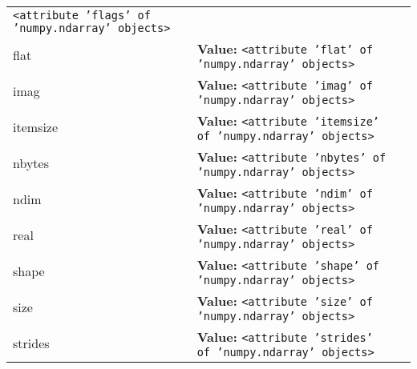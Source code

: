 \begin{longtable}{|p{}|p{}|l}
{\tt {\textless}attribute 'flags' of 'numpy.ndarray' objects{\textgreater}}&\\
\cline{1-2}
\raggedright f\-l\-a\-t\- & \raggedright \textbf{Value:} 
{\tt {\textless}attribute 'flat' of 'numpy.ndarray' objects{\textgreater}}&\\
\cline{1-2}
\raggedright i\-m\-a\-g\- & \raggedright \textbf{Value:} 
{\tt {\textless}attribute 'imag' of 'numpy.ndarray' objects{\textgreater}}&\\
\cline{1-2}
\raggedright i\-t\-e\-m\-s\-i\-z\-e\- & \raggedright \textbf{Value:} 
{\tt {\textless}attribute 'itemsize' of 'numpy.ndarray' objects{\textgreater}}&\\
\cline{1-2}
\raggedright n\-b\-y\-t\-e\-s\- & \raggedright \textbf{Value:} 
{\tt {\textless}attribute 'nbytes' of 'numpy.ndarray' objects{\textgreater}}&\\
\cline{1-2}
\raggedright n\-d\-i\-m\- & \raggedright \textbf{Value:} 
{\tt {\textless}attribute 'ndim' of 'numpy.ndarray' objects{\textgreater}}&\\
\cline{1-2}
\raggedright r\-e\-a\-l\- & \raggedright \textbf{Value:} 
{\tt {\textless}attribute 'real' of 'numpy.ndarray' objects{\textgreater}}&\\
\cline{1-2}
\raggedright s\-h\-a\-p\-e\- & \raggedright \textbf{Value:} 
{\tt {\textless}attribute 'shape' of 'numpy.ndarray' objects{\textgreater}}&\\
\cline{1-2}
\raggedright s\-i\-z\-e\- & \raggedright \textbf{Value:} 
{\tt {\textless}attribute 'size' of 'numpy.ndarray' objects{\textgreater}}&\\
\cline{1-2}
\raggedright s\-t\-r\-i\-d\-e\-s\- & \raggedright \textbf{Value:} 
{\tt {\textless}attribute 'strides' of 'numpy.ndarray' objects{\textgreater}}&\\
\cline{1-2}
\end{longtable}

